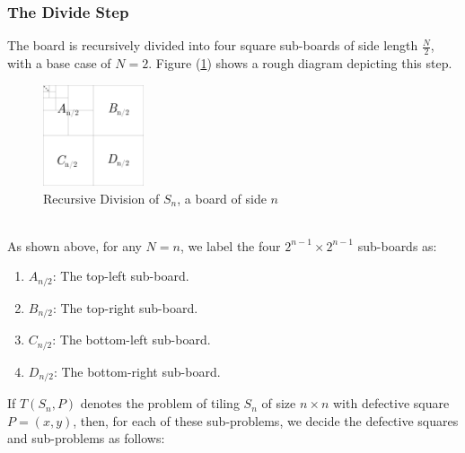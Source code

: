 \documentclass[12pt]{report}
\begin{document}
    \subsubsection*{The Divide Step}
    The board is recursively divided into four square sub-boards of side length $\frac{N}{2}$,
    with a base case of $N = 2$.
    Figure (\ref{fig:divide}) shows a rough diagram depicting this step.
    \begin{figure}[htp]
        \begin{center}
            \includegraphics[width=0.265\textwidth]{divide-1.png}
        \end{center}
        \caption{Recursive Division of $S_{n}$, a board of side $n$}
        \label{fig:divide}
    \end{figure}
    \vspace*{10pt} \\
    As shown above, for any $N = n$, we label the four $2^{n-1} \times 2^{n-1}$ sub-boards as:
    \begin{enumerate}
        \item $A_{n/2}$: The top-left sub-board.
        \item $B_{n/2}$: The top-right sub-board.
        \item $C_{n/2}$: The bottom-left sub-board.
        \item $D_{n/2}$: The bottom-right sub-board.
    \end{enumerate}
    If $T(S_{n}, P)$ denotes the problem of tiling $S_{n}$ of size $n \times n$ with defective square $P = (x, y)$,
    then, for each of these sub-problems, we decide the defective squares and sub-problems as follows:
\end{document}
